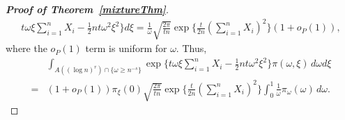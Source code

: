 \documentclass[11pt]{article}
\theoremstyle{plain}
\theoremstyle{definition}
\theoremstyle{remark}
\begin{document}
\begin{appendices}
\begin{proof}[\textbf{Proof of Theorem~\ref{mixtureThm}}]
\begin{align*}
        t\omega \xi \sum_{i=1}^n X_i -\frac{1}{2} nt\omega^2 \xi^2
\big\} d\xi
=
 \frac{1}{\omega}\sqrt{\frac{2\pi}{tn}}  \exp\Big\{\frac{t}{2n}(\sum_{i=1}^n X_i)^2\Big\}
(1+o_P(1)),
\end{align*}
where the $o_P(1)$ term is uniform for $\omega$.
Thus,
\begin{align*}
    &\int_{A((\log n)^r)\cap \{\omega\geq n^{-s}\} } \exp\big\{
        t\omega \xi \sum_{i=1}^n X_i -\frac{1}{2} nt\omega^2 \xi^2
    \big\} \pi(\omega,\xi)\, d\omega d\xi
    \\
=&(1+o_P(1))\pi_{\xi}(0)\sqrt{\frac{2\pi}{tn}}\exp \Big\{ \frac{t}{2n}(\sum_{i=1}^n X_i)^2\Big\} 
\int_{0}^1 
\frac{1}{\omega}
\pi_{\omega}(\omega)\, d\omega.
\end{align*}



\end{proof}
\end{appendices}
\end{document}
